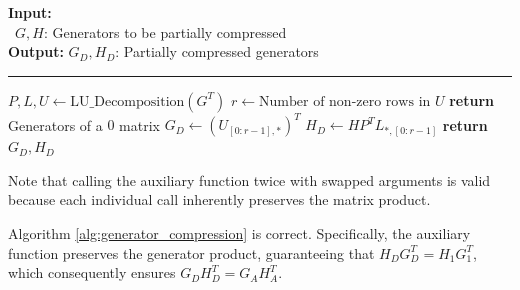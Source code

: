 \begin{algorithm}[H]
  \caption{Generator Compression Auxiliary}

  \textbf{Input:} \\
  \hspace*{0.5cm} \textbullet \ $G, H$: Generators to be partially compressed \\
  \textbf{Output:} $G_D, H_D$: Partially compressed generators

  \vspace{0.15cm}
  \hrule
  \vspace{0.15cm}

  \begin{algorithmic}[1]
    \State $P, L, U \gets \text{LU\_Decomposition}(G^T)$
    \State $r \gets \text{Number of non-zero rows in } U$
    \State \textbf{return} Generators of a $0$ matrix
    \EndIf
    \State $G_{D} \gets (U_{[0:r-1],*})^T$
    \State $H_{D} \gets H P^T L_{*,[0:r-1]}$
    \State \textbf{return} $G_D, H_D$
    \EndFunction
  \end{algorithmic}
\end{algorithm}

Note that calling the auxiliary function twice with swapped arguments
is valid because each individual call inherently preserves the matrix
product.

\begin{proposition}
  Algorithm \ref{alg:generator_compression} is correct. Specifically,
  the auxiliary function preserves the generator product,
  guaranteeing that $H_D G_D^T = H_1 G_1^T$, which consequently
  ensures $G_D H_D^T = G_A H_A^T$.
\end{proposition}

